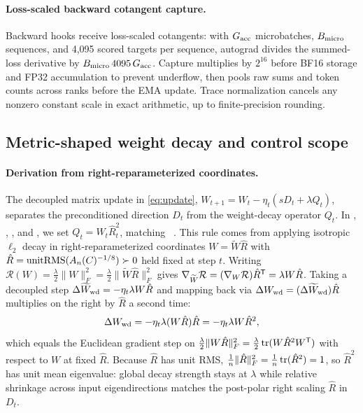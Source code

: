 \paragraph{Loss-scaled backward cotangent capture.}
Backward hooks receive loss-scaled cotangents: with $G_{\rm acc}$ microbatches, $B_{\rm micro}$ sequences, and 4,095 scored targets per sequence, autograd divides the summed-loss derivative by $B_{\rm micro}\,4095\,G_{\rm acc}$. Capture multiplies by $2^{16}$ before BF16 storage and FP32 accumulation to prevent underflow, then pools raw sums and token counts across ranks before the EMA update. Trace normalization cancels any nonzero constant scale in exact arithmetic, up to finite-precision rounding.

\subsection{Metric-shaped weight decay and control scope}
\label{app:weight_decay}

\paragraph{Derivation from right-reparameterized coordinates.}
The decoupled matrix update in \cref{eq:update}, $W_{t+1}=W_t-\eta_t(s D_t+\lambda Q_t)$, separates the preconditioned direction $D_t$ from the weight-decay operator $Q_t$. In , , , and , we set $Q_t=W_t\hat R_t^2$, matching ~\citep{mohamadi2026toner}. This rule comes from applying isotropic $\ell_2$ decay in right-reparameterized coordinates $W=\widetilde W\hat R$ with $\hat R=\operatorname{unitRMS}(A_n(C)^{-1/8})\succ0$ held fixed at step $t$. Writing $\mathcal R(W)=\frac{\lambda}{2}\|W\|_F^2=\frac{\lambda}{2}\|\widetilde W\hat R\|_F^2$ gives $\nabla_{\widetilde W}\mathcal R=(\nabla_W\mathcal R)\hat R^{{\mathsf{T}}}=\lambda W\hat R$. Taking a decoupled step $\Delta\widetilde W_{\rm wd}=-\eta_t\lambda W\hat R$ and mapping back via $\Delta W_{\rm wd}=(\Delta\widetilde W_{\rm wd})\hat R$ multiplies on the right by $\hat R$ a second time:
\[
 \Delta W_{\rm wd}=-\eta_t\lambda(W\hat R)\hat R=-\eta_t\lambda W\hat R^2,
\]
which equals the Euclidean gradient step on $\frac{\lambda}{2}\|W\hat R\|_F^2=\frac{\lambda}{2}\operatorname{tr}(W\hat R^2 W^{{\mathsf{T}}})$ with respect to $W$ at fixed $\hat R$. Because $\hat R$ has unit RMS, $\frac{1}{n}\|\hat R\|_F^2=\frac{1}{n}\operatorname{tr}(\hat R^2)=1$, so $\hat R^2$ has unit mean eigenvalue: global decay strength stays at $\lambda$ while relative shrinkage across input eigendirections matches the post-polar right scaling $\hat R$ in $D_t$.

